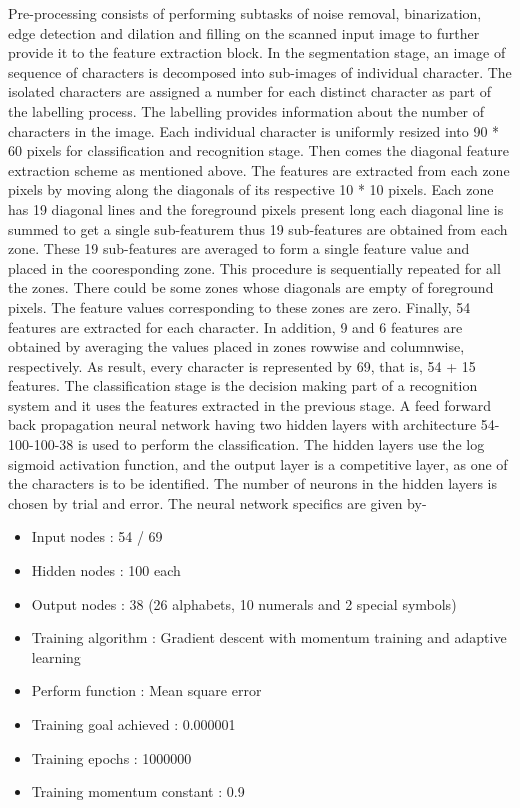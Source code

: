 \documentclass[main.tex]{subfiles}
\begin{document}
Pre-processing consists of performing subtasks of noise removal, binarization,
edge detection and dilation and filling on the scanned input image to further
provide it to the feature extraction block. In the segmentation stage, an image
of sequence of characters is decomposed into sub-images of individual character.
The isolated characters are assigned a number for each distinct character as
part of the labelling process. The labelling provides information about the
number of characters in the image. Each individual character is uniformly
resized into 90 * 60 pixels for classification and recognition stage. Then comes
the diagonal feature extraction scheme as mentioned above. The features are
extracted from each zone pixels by moving along the diagonals of its respective
10 * 10 pixels. Each zone has 19 diagonal lines and the foreground pixels
present long each diagonal line is summed to get a single sub-featurem thus 19
sub-features are obtained from each zone. These 19 sub-features are averaged to
form a single feature value and placed in the cooresponding zone. This procedure
is sequentially repeated for all the zones. There could be some zones whose
diagonals are empty of foreground pixels. The feature values corresponding to
these zones are zero. Finally, 54 features are extracted for each character. In
addition, 9 and 6 features are obtained by averaging the values placed in zones
rowwise and columnwise, respectively. As result, every character is represented
by 69, that is, 54 + 15 features. The classification stage is the decision
making part of a recognition system and it uses the features extracted in the
previous stage. A feed forward back propagation neural network having two hidden
layers with architecture 54-100-100-38 is used to perform the classification.
The hidden layers use the log sigmoid activation function, and the output layer
is a competitive layer, as one of the characters is to be identified. The number
of neurons in the hidden layers is chosen by trial and error. The neural network
specifics are given by-
\begin{center}
\begin{itemize}
	\item Input nodes : 54 / 69
	\item Hidden nodes : 100 each
	\item Output nodes : 38 (26 alphabets, 10 numerals and 2 special symbols)
	\item Training algorithm : Gradient descent with momentum training and
		adaptive learning
	\item Perform function : Mean square error
	\item Training goal achieved : 0.000001
	\item Training epochs : 1000000
	\item Training momentum constant : 0.9
\end{itemize}
\end{center}
\end{document}
